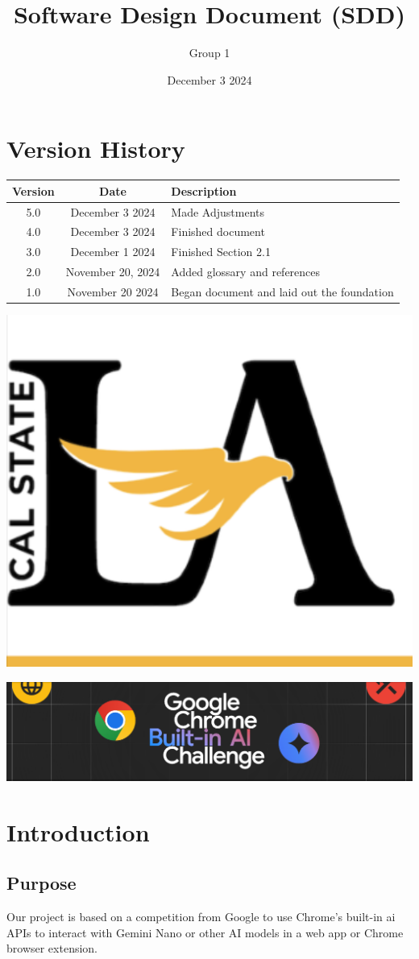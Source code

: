 \documentclass{article}
\title{Software Design Document (SDD)}
\author{Group 1 }
\date{December 3 2024}
\begin{document}
\maketitle  
\pagebreak

\tableofcontents
\pagebreak

\section*{Version History}
\begin{longtable}{|c|c|p{10cm}|}
\hline
\textbf{Version} & \textbf{Date} & \textbf{Description} \\ \hline
5.0 & December 3 2024 & Made Adjustments \\ \hline
4.0 & December 3 2024 & Finished document \\ \hline
3.0 & December 1 2024 & Finished Section 2.1 \\ \hline
2.0 &November 20, 2024 & Added glossary and references \\ \hline
1.0 & November 20 2024 & Began document and laid out the foundation \\ \hline
\end{longtable}
\pagebreak

\includegraphics[width=0.3\linewidth]{../logo/csula.png} 

\includegraphics[width=0.3\linewidth]{../logo/chromeai.png} 

\section{Introduction}

\subsection{Purpose}
Our project is based on a competition from Google to use Chrome's built-in \Gls{ai} APIs to interact with Gemini Nano or other AI models in a web app or Chrome browser extension. 
\end{document}
